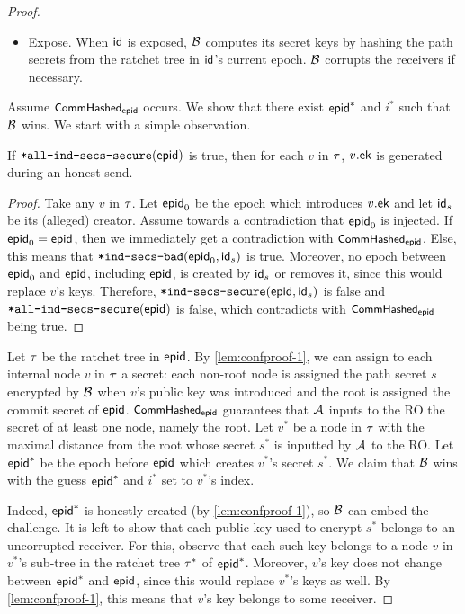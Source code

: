 \begin{proof}
\begin{itemize}
  \item {\sc Expose.}
    When ${\mathsf{id}}$ is exposed, $\mathcal{B}_{\relax}$ computes its \mmPKE secret keys by hashing the path secrets from the ratchet tree in ${\mathsf{id}}$'s current epoch. $\mathcal{B}_{\relax}$ corrupts the \mmowrcca receivers if necessary.
\end{itemize}

Assume $\textnormal{\textsf{\small CommHashed}}_{{\normalfont\textsf{epid}}}$ occurs. We show that there exist ${\normalfont\textsf{epid}}^*$ and $i^*$ such that $\mathcal{B}_{\relax}$ wins. We start with a simple observation.
\begin{lemma}
  If ${\textnormal{\tt*all-ind-secs-secure}}({\normalfont\textsf{epid}})$ is true, then for each $v$ in $\tau$, $v.{\mathsf{ek}}$ is generated during an honest send.
\label{lem:confproof-1}\end{lemma}
\begin{proof}
  Take any $v$ in $\tau$. Let ${\normalfont\textsf{epid}}_0$ be the epoch which introduces $v.{\mathsf{ek}}$ and let ${\mathsf{id}}_s$ be its (alleged) creator. Assume towards a contradiction that ${\normalfont\textsf{epid}}_0$ is injected. If ${\normalfont\textsf{epid}}_0={\normalfont\textsf{epid}}$, then we immediately get a contradiction with $\textnormal{\textsf{\small CommHashed}}_{\normalfont\textsf{epid}}$. Else, this means that ${\textnormal{\tt*ind-secs-bad}}({\normalfont\textsf{epid}}_0, {\mathsf{id}}_s)$ is true. Moreover, no epoch between ${\normalfont\textsf{epid}}_0$ and ${\normalfont\textsf{epid}}$, including ${\normalfont\textsf{epid}}$, is created by ${\mathsf{id}}_s$ or removes it, since this would replace $v$'s keys. Therefore, ${\textnormal{\tt*ind-secs-secure}}({\normalfont\textsf{epid}}, {\mathsf{id}}_s)$ is false and ${\textnormal{\tt*all-ind-secs-secure}}({\normalfont\textsf{epid}})$ is false, which contradicts with $\textnormal{\textsf{\small CommHashed}}_{\normalfont\textsf{epid}}$ being true.
\end{proof}

Let $\tau$ be the ratchet tree in ${\normalfont\textsf{epid}}$. By \cref{lem:confproof-1}, we can assign to each internal node $v$ in $\tau$ a secret: each non-root node is assigned the path secret $s$ encrypted by $\mathcal{B}_{\relax}$ when $v$'s public key was introduced and the root is assigned the commit secret of ${\normalfont\textsf{epid}}$.
$\textnormal{\textsf{\small CommHashed}}_{{\normalfont\textsf{epid}}}$ guarantees that $\mathcal{A}_{\relax}$ inputs to the RO the secret of at least one node, namely the root. Let $v^*$ be a node in $\tau$ with the maximal distance from the root whose secret $s^*$ is inputted by $\mathcal{A}_{\relax}$ to the RO. Let ${\normalfont\textsf{epid}}^*$ be the epoch before ${\normalfont\textsf{epid}}$ which creates $v^*$'s secret $s^*$. We claim that $\mathcal{B}_{\relax}$ wins with the guess ${\normalfont\textsf{epid}}^*$ and $i^*$ set to $v^*$'s index.

Indeed, ${\normalfont\textsf{epid}}^*$ is honestly created (by \cref{lem:confproof-1}), so $\mathcal{B}_{\relax}$ can embed the challenge. It is left to show that each public key used to encrypt $s^*$ belongs to an uncorrupted \mmowrcca receiver. For this, observe that each such key belongs to a node $v$ in $v^*$'s sub-tree in the ratchet tree $\tau^*$ of ${\normalfont\textsf{epid}}^*$. Moreover, $v$'s key does not change between ${\normalfont\textsf{epid}}^*$ and ${\normalfont\textsf{epid}}$, since this would replace $v^*$'s keys as well. By \cref{lem:confproof-1}, this means that $v$'s key belongs to some \mmowrcca receiver.


\end{proof}
